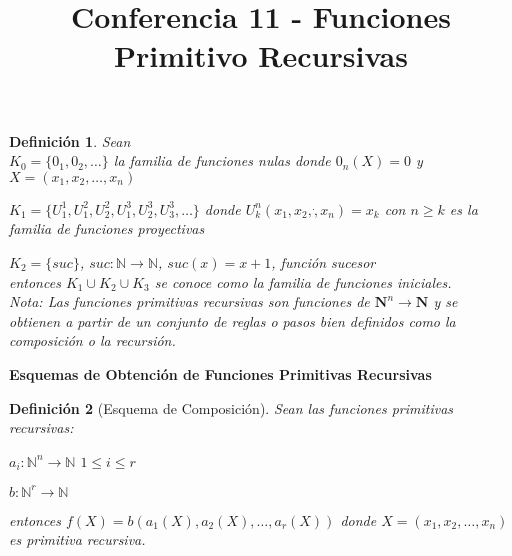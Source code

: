 \documentclass[a4paper,1pt]{report}
\title{Conferencia 11 - Funciones Primitivo Recursivas}
\author{}
\newtheorem*{dfn}{Definición}
\begin{document}
\maketitle

\begin{dfn}
 Sean \\
 
 $K_0=\{0_1,0_2, \dots \}$ la familia de funciones nulas donde $0_n(X)=0$ y $X=(x_1,x_2,\dots,x_n)$
 
 $K_1=\{U^1_1, U^2_1, U^2_2,U^3_1,U^3_2,U^3_3, \dots \}$ donde $U^n_k(x_1,x_2,\dot,x_n)=x_k$ con $n \geq k$ es la familia de funciones proyectivas
 
 $K_2= \{suc\}$, $suc:\mathbb{N}\rightarrow\mathbb{N}$, $suc(x)=x+1$, función sucesor\\
 
entonces $K_1\cup K_2\cup K_3$ se conoce como la familia de funciones iniciales.\\

Nota: Las funciones primitivas recursivas son funciones de $\mathbf{N}^n  \rightarrow \mathbf{N}$ y se obtienen a partir de un conjunto de reglas o pasos bien definidos como la composici\'on o la recursi\'on.
\end{dfn}


\textbf{Esquemas de Obtenci\'on de Funciones Primitivas Recursivas}

\begin{dfn}[Esquema de Composición]
Sean las funciones primitivas recursivas:

$a_i:\mathbb{N}^n\rightarrow\mathbb{N}$  $1\leq i \leq r$

$b:\mathbb{N}^r\rightarrow\mathbb{N}$


entonces $f(X)=b(a_1(X),a_2(X),\dots,a_r(X))$ donde $X=(x_1,x_2,\dots,x_n)$ es primitiva recursiva.
 
\end{dfn}
\end{document}
